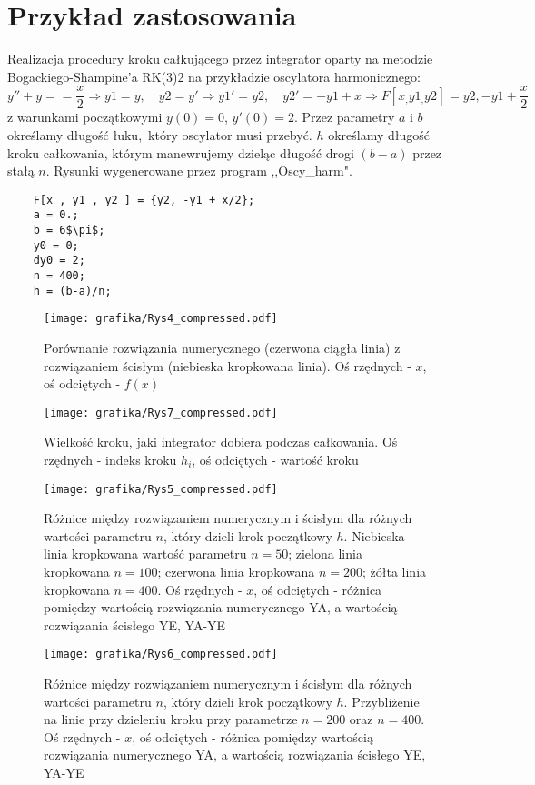 \section{Przykład zastosowania}\label{s:AA}
Realizacja procedury kroku całkującego przez integrator oparty na metodzie Bogackiego-Shampine'a RK(3)2 na przykładzie oscylatora harmonicznego: 
$$y'' + y == \frac{x}{2}\Rightarrow y1=y,\quad y2=y' \Rightarrow y1'=y2,\quad y2'=-y1+x \Rightarrow F[x_, y1_, y2_{}] = {y2, -y1 + \frac{x}{2}}$$
z warunkami początkowymi $y(0) = 0$, $y'(0) = 2$. Przez parametry $a$ i $b$ określamy długość łuku,~który oscylator musi przebyć. $h$ określamy długość kroku całkowania, którym manewrujemy dzieląc długość drogi $(b-a)$ przez stałą $n$. Rysunki wygenerowane przez program ,,Oscy\_harm".
\begin{lstlisting}
    F[x_, y1_, y2_] = {y2, -y1 + x/2};
    a = 0.; 
    b = 6$\pi$;
    y0 = 0;
    dy0 = 2;
    n = 400;
    h = (b-a)/n;
\end{lstlisting}
\begin{figure}[H]
    \centering
    \texttt{[image: grafika/Rys4\_compressed.pdf]}
    \caption{Porównanie rozwiązania numerycznego (czerwona ciągła linia) z rozwiązaniem ścisłym (niebieska kropkowana linia). Oś rzędnych - $x$, oś odciętych - $f(x)$}
\end{figure}
\begin{figure}[H]
    \centering
    \texttt{[image: grafika/Rys7\_compressed.pdf]}
    \caption{Wielkość kroku, jaki integrator dobiera podczas całkowania. Oś rzędnych - indeks kroku $h_i$, oś odciętych - wartość kroku}
\end{figure}
\begin{figure}[H]
    \centering
    \texttt{[image: grafika/Rys5\_compressed.pdf]}
    \caption{Różnice między rozwiązaniem numerycznym i ścisłym dla różnych wartości parametru $n$, który dzieli krok początkowy $h$. Niebieska linia kropkowana wartość parametru $n = 50$; zielona linia kropkowana $n = 100$; czerwona linia kropkowana $n = 200$; żółta linia kropkowana $n = 400$. Oś rzędnych - $x$, oś odciętych - różnica pomiędzy wartością rozwiązania numerycznego YA, a wartością rozwiązania ścisłego YE, YA-YE}
\end{figure}
\begin{figure}[H]
    \centering
    \texttt{[image: grafika/Rys6\_compressed.pdf]}
    \caption{Różnice między rozwiązaniem numerycznym i ścisłym dla różnych wartości parametru $n$, który dzieli krok początkowy $h$. Przybliżenie na linie przy dzieleniu kroku przy parametrze $n = 200$ oraz $n = 400$. Oś rzędnych - $x$, oś odciętych - różnica pomiędzy wartością rozwiązania numerycznego YA, a wartością rozwiązania ścisłego YE, YA-YE}
\end{figure}


